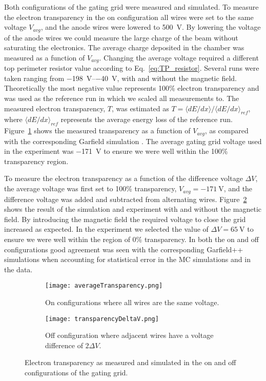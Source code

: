 Both configurations of the gating grid were measured and simulated. To measure the electron transparency in the on configuration all wires were set to the same voltage $V_{avg}$, and the anode wires were lowered to \SI{500}{\volt}. By lowering the voltage of the anode wires we could measure the large charge of the beam without saturating the electronics. The average charge deposited in the chamber was measured as a function of $V_{avg}$. Changing the average voltage required a different top perimeter resistor value according to Eq.~\ref{eq:TP_resistor}. Several runs were taken ranging from \SIrange{-198}{-40}{\volt}, with and without the magnetic field. Theoretically the most negative value represents 100\% electron transparency and was used as the reference run in which we scaled all measurements to. The measured electron transparency, $T$, was estimated as $T = \langle dE/dx\rangle/{\langle dE/dx\rangle}_{ref}$, where $\langle dE/dx\rangle_{ref}$ represents the average energy loss of the reference run. Figure~\ref{fig:ggAvgTrans} shows the measured transparency as a function of $V_{avg}$, as compared with the corresponding Garfield simulation \cite{garfield++}. The average gating grid voltage used in the experiment was \SI{-171}{\volt} to ensure we were well within the 100\% transparency region. 

To measure the electron transparency as a function of the difference voltage $\Delta V$, the average voltage was first set to 100\% transparency, $V_{avg}=\SI{-171}{\volt}$, and the difference voltage was added and subtracted from alternating wires. Figure~\ref{fig:ggDeltaVTrans} shows the result of the simulation and experiment with and without the magnetic field. By introducing the magnetic field the required voltage to close the grid increased as expected. In the experiment we selected the value of $\Delta V = \SI{65}{\volt}$ to ensure we were well within the region of 0\% transparency. In both the on and off configurations good agreement was seen with the corresponding Garfield++ simulations when accounting for statistical error in the MC simulations and in the data.   

\begin{figure}[!htb]
    \centering
    \begin{subfigure}[t]{0.49\textwidth}
        \centering
        \texttt{[image: averageTransparency.png]} 
        \caption{On configurations where all wires are the same voltage.} \label{fig:ggAvgTrans}
    \end{subfigure}
    \hfill
    \begin{subfigure}[t]{0.49\textwidth}
        \centering
        \texttt{[image: transparencyDeltaV.png]} 
        \caption{Off configuration where adjacent wires have a voltage difference of $2 \Delta V$.} \label{fig:ggDeltaVTrans}
    \end{subfigure}
    
\caption{Electron transparency as measured and simulated in the on and off configurations of the gating grid.}    
\label{fig:ggTrans}
\end{figure}



